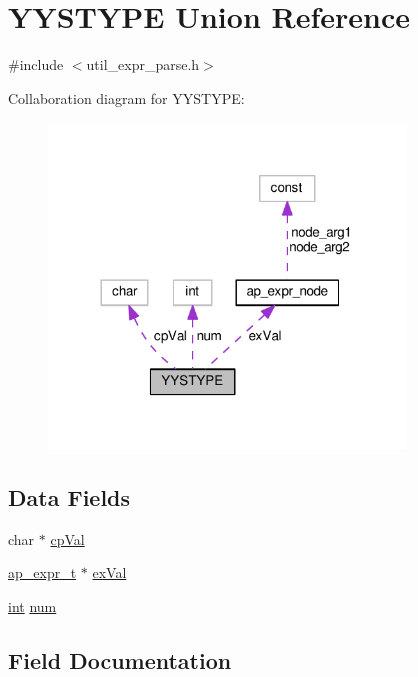 \hypertarget{unionYYSTYPE}{}\section{Y\+Y\+S\+T\+Y\+PE Union Reference}
\label{unionYYSTYPE}


{\ttfamily \#include $<$util\+\_\+expr\+\_\+parse.\+h$>$}



Collaboration diagram for Y\+Y\+S\+T\+Y\+PE\+:
\nopagebreak
\begin{figure}[H]
\begin{center}
\leavevmode
\includegraphics[width=269pt]{unionYYSTYPE__coll__graph}
\end{center}
\end{figure}
\subsection*{Data Fields}
\begin{DoxyCompactItemize}
\item 
char $\ast$ \hyperlink{unionYYSTYPE_ae72ddd319c919f8ff6b80b18c5a83e06}{cp\+Val}
\item 
\hyperlink{group__AP__EXPR_ga1495a85c3a89e64cf625dfe1a5905fcb}{ap\+\_\+expr\+\_\+t} $\ast$ \hyperlink{unionYYSTYPE_a5cd67677ec2dad472d7966eb75d9b0a4}{ex\+Val}
\item 
\hyperlink{pcre_8txt_a42dfa4ff673c82d8efe7144098fbc198}{int} \hyperlink{unionYYSTYPE_a682841bb1e050ccf132867fe08502496}{num}
\end{DoxyCompactItemize}


\subsection{Field Documentation}
